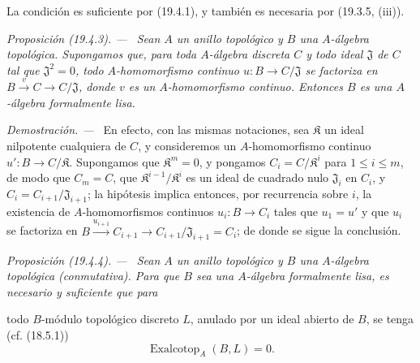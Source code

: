 \documentclass[10pt,oneside]{book}
\makeatletter
\newcommand{\setmanualcurrentlabel}[1]{\def\@currentlabel{#1}}
\newcommand{\oldpage}[2][]{%
  \setcounter{footnote}{0}%
  \marginpar{\scriptsize\textbf{#1}~|~#2}\ignorespaces}
\newenvironment{proposition}[1][]{%
  \setmanualcurrentlabel{#1}\par\medskip\noindent\itshape Proposición (#1). ---\ }{\par}
\newenvironment{proof}{%
  \par\medskip\noindent\textit{Demostración. ---\ }}{\par}
\makeatother
\begin{document}
La condición es suficiente por (19.4.1), y también es necesaria por
(19.3.5, (iii)).

\begin{proposition}[19.4.3]
\label{0.19.4.3-es}
Sean $A$ un anillo topológico y $B$ una $A$-álgebra topológica. Supongamos
que, para toda $A$-álgebra discreta $C$ y todo ideal $\mathfrak J$ de $C$
tal que $\mathfrak J^2=0$, todo $A$-homomorfismo continuo
$u:B\to C/\mathfrak J$ se factoriza en
$B\xrightarrow{v}C\to C/\mathfrak J$, donde $v$ es un $A$-homomorfismo
continuo. Entonces $B$ es una $A$-álgebra formalmente lisa.
\end{proposition}

\begin{proof}
En efecto, con las mismas notaciones, sea $\mathfrak K$ un ideal nilpotente
cualquiera de $C$, y consideremos un $A$-homomorfismo continuo
$u':B\to C/\mathfrak K$. Supongamos que $\mathfrak K^m=0$, y pongamos
$C_i=C/\mathfrak K^i$ para $1\leq i\leq m$, de modo que $C_m=C$, que
$\mathfrak K^{i-1}/\mathfrak K^i$ es un ideal de cuadrado nulo
$\mathfrak J_i$ en $C_i$, y $C_i=C_{i+1}/\mathfrak J_{i+1}$;
la hipótesis implica entonces, por recurrencia sobre $i$, la existencia de
$A$-homomorfismos continuos $u_i:B\to C_i$ tales que $u_1=u'$ y que $u_i$
se factoriza en
$B\xrightarrow{u_{i+1}}C_{i+1}\to C_{i+1}/\mathfrak J_{i+1}=C_i$;
de donde se sigue la conclusión.
\end{proof}

\begin{proposition}[19.4.4]
\label{0.19.4.4-es}
Sean $A$ un anillo topológico y $B$ una $A$-álgebra topológica
(conmutativa). Para que $B$ sea una $A$-álgebra formalmente lisa, es necesario y
suficiente que para

\oldpage[0\textsubscript{IV-1}]{87}

todo $B$-módulo topológico discreto $L$, anulado por un ideal abierto de $B$, se
tenga \textup{(cf. (18.5.1))}
\[
  \operatorname{Exalcotop}_A(B,L)=0.
\]
\end{proposition}
\end{document}
